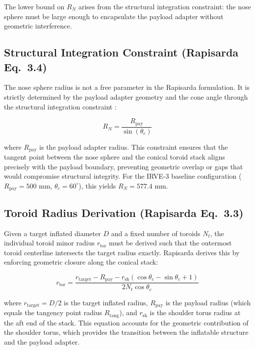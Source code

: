 \noindent The lower bound on $R_N$ arises from the structural integration constraint: the nose sphere must be large enough to encapsulate the payload adapter without geometric interference.

\subsection{Structural Integration Constraint (Rapisarda Eq.\ 3.4)}

The nose sphere radius is not a free parameter in the Rapisarda formulation. It is strictly determined by the payload adapter geometry and the cone angle through the structural integration constraint \cite{rapisarda2023mdao}:

\begin{equation}
    R_N = \frac{R_{\text{pay}}}{\sin(\theta_c)}
    \label{eq:structural_integration}
\end{equation}

\noindent where $R_{\text{pay}}$ is the payload adapter radius. This constraint ensures that the tangent point between the nose sphere and the conical toroid stack aligns precisely with the payload boundary, preventing geometric overlap or gaps that would compromise structural integrity. For the IRVE-3 baseline configuration ($R_{\text{pay}} = 500$ mm, $\theta_c = 60^\circ$), this yields $R_N = 577.4$ mm.

\subsection{Toroid Radius Derivation (Rapisarda Eq.\ 3.3)}

Given a target inflated diameter $D$ and a fixed number of toroids $N_t$, the individual toroid minor radius $r_{\text{tor}}$ must be derived such that the outermost toroid centerline intersects the target radius exactly. Rapisarda \cite{rapisarda2023mdao} derives this by enforcing geometric closure along the conical stack:

\begin{equation}
    r_{\text{tor}} = \frac{r_{\text{target}} - R_{\text{pay}} - r_{\text{sh}} \left( \cos\theta_c - \sin\theta_c + 1 \right)}{2 N_t \cos\theta_c}
    \label{eq:toroid_radius}
\end{equation}

\noindent where $r_{\text{target}} = D/2$ is the target inflated radius, $R_{\text{pay}}$ is the payload radius (which equals the tangency point radius $R_{\text{tang}}$), and $r_{\text{sh}}$ is the shoulder torus radius at the aft end of the stack. This equation accounts for the geometric contribution of the shoulder torus, which provides the transition between the inflatable structure and the payload adapter.

